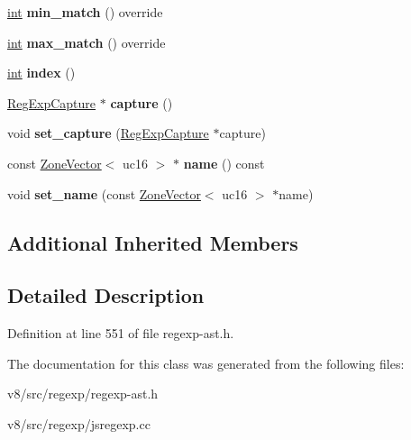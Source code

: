 \begin{DoxyCompactItemize}
\item 
\mbox{\label{classv8_1_1internal_1_1RegExpBackReference_a1a346721ea8a72c3c2ce3c237cf477e5}} 
\mbox{\hyperlink{classint}{int}} {\bfseries min\+\_\+match} () override
\item 
\mbox{\label{classv8_1_1internal_1_1RegExpBackReference_a93c1549501adc0de419418dabd4f1e3f}} 
\mbox{\hyperlink{classint}{int}} {\bfseries max\+\_\+match} () override
\item 
\mbox{\label{classv8_1_1internal_1_1RegExpBackReference_ad731fce769b3b8cee0dc6f0108aa0974}} 
\mbox{\hyperlink{classint}{int}} {\bfseries index} ()
\item 
\mbox{\label{classv8_1_1internal_1_1RegExpBackReference_aceceec7e4a061ac9aaddceaabf3ed755}} 
\mbox{\hyperlink{classv8_1_1internal_1_1RegExpCapture}{Reg\+Exp\+Capture}} $\ast$ {\bfseries capture} ()
\item 
\mbox{\label{classv8_1_1internal_1_1RegExpBackReference_a18811874a5082508e28741bba3ed0cfb}} 
void {\bfseries set\+\_\+capture} (\mbox{\hyperlink{classv8_1_1internal_1_1RegExpCapture}{Reg\+Exp\+Capture}} $\ast$capture)
\item 
\mbox{\label{classv8_1_1internal_1_1RegExpBackReference_a230ea42fef1596e6f283d7cbb908b541}} 
const \mbox{\hyperlink{classv8_1_1internal_1_1ZoneVector}{Zone\+Vector}}$<$ uc16 $>$ $\ast$ {\bfseries name} () const
\item 
\mbox{\label{classv8_1_1internal_1_1RegExpBackReference_a3ab4f9c1d65ecfe47449ebd65b7a00ab}} 
void {\bfseries set\+\_\+name} (const \mbox{\hyperlink{classv8_1_1internal_1_1ZoneVector}{Zone\+Vector}}$<$ uc16 $>$ $\ast$name)
\end{DoxyCompactItemize}
\subsection*{Additional Inherited Members}


\subsection{Detailed Description}


Definition at line 551 of file regexp-\/ast.\+h.



The documentation for this class was generated from the following files\+:\begin{DoxyCompactItemize}
\item 
v8/src/regexp/regexp-\/ast.\+h\item 
v8/src/regexp/jsregexp.\+cc\end{DoxyCompactItemize}
